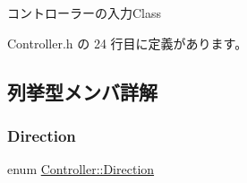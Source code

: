 コントローラーの入力\+Class 

 Controller.\+h の 24 行目に定義があります。



\subsection{列挙型メンバ詳解}
\mbox{\label{class_controller_a08e36bbdccc56ce55cdbd5dcc0f438d4}} 
\subsubsection{\texorpdfstring{Direction}{Direction}}
{\footnotesize\ttfamily enum \mbox{\hyperlink{class_controller_a08e36bbdccc56ce55cdbd5dcc0f438d4}{Controller\+::\+Direction}}\hspace{0.3cm}{\ttfamily [strong]}}

